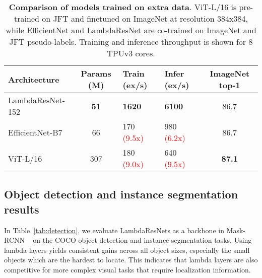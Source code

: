 \documentclass{article} \usepackage{iclr2021_conference,times}
\begin{document}
\begin{table}[h]
  \begin{center}
  \small
  \begin{tabular}{lcllc}
    \toprule
    Architecture & Params (M) & Train (ex/s) & Infer (ex/s) & ImageNet top-1 \\
    \midrule
    LambdaResNet-152 & \textbf{51} & \textbf{1620} & \textbf{6100} & 86.7 \\
    EfficientNet-B7 & 66 & 170 \textcolor{red}{(9.5x)} & 980 \textcolor{red}{(6.2x)} & 86.7 \\
    ViT-L/16 & 307 & 180 \textcolor{red}{(9.0x)} & 640 \textcolor{red}{(9.5x)} & \textbf{87.1} \\
    \bottomrule
  \end{tabular}
  \caption{
  \textbf{Comparison of models trained on extra data}.
  ViT-L/16 is pre-trained on JFT and finetuned on ImageNet at resolution 384x384, while EfficientNet and LambdaResNet are co-trained on ImageNet and JFT pseudo-labels.
  Training and inference throughput is shown for 8 TPUv3 cores.
  }
  \label{tab:pseudo_labels}
  \vspace{-0.3cm}
  \end{center}
\end{table}

\subsection{Object detection and instance segmentation results}
In Table~\ref{tab:detection}, we evaluate LambdaResNets as a backbone in Mask-RCNN ~\citep{he2017mask} on the COCO object detection and instance segmentation tasks.
Using lambda layers yields consistent gains across all object sizes, especially the small objects which are the hardest to locate.
This indicates that lambda layers are also competitive for more complex visual tasks that require localization information.
\end{document}

